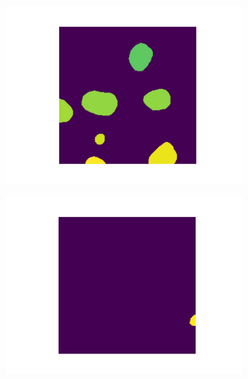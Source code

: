 \documentclass[target=bach,aauheader=,style=]{thud}
\begin{document}
\begin{figure}[ht]
\centering
\begin{subfigure}{0.32\textwidth}
  \centering
  \includegraphics[width=\linewidth]{imgs/dataset/neop.png}
  \caption{}
\end{subfigure}\hfill
\begin{subfigure}{0.32\textwidth}
  \centering
  \includegraphics[width=\linewidth]{imgs/dataset/notneop.png}
  \caption{}
\end{subfigure}\hfill
\begin{subfigure}{0.32\textwidth}
  \centering

\end{subfigure}
\end{figure}
\end{document}
